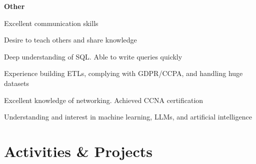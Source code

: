 \documentclass[margin,line]{resume}
\begin{document}
\begin{resume}
    \hspace{2.4mm}\textbf{Other}\vspace{1mm}
    \begin{list2}
        \item Excellent communication skills
        \item Desire to teach others and share knowledge
        \item Deep understanding of SQL. Able to write queries quickly
        \item Experience building ETLs, complying with GDPR/CCPA, and handling huge datasets
        \item Excellent knowledge of networking. Achieved CCNA certification
        \item Understanding and interest in machine learning, LLMs, and artificial intelligence
    \end{list2}\vspace{-1.5mm}

\sectionline

    \section{\mysidestyle \textbf{\large{A}\small{ctivities \& Projects}}}


\end{resume}
\end{document}
